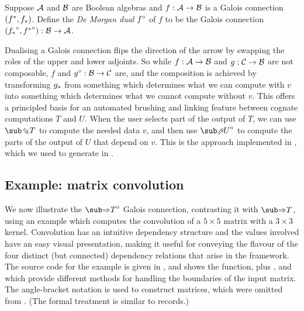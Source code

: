 \begin{definition}
   Suppose $\mathcal{A}$ and $\mathcal{B}$ are Boolean algebras and $f: \mathcal{A} \to \mathcal{B}$ is a Galois connection $({f}^*,{f}_*)$. Define the \emph{De Morgan dual} ${f}^{\circ}$ of $f$ to be the Galois connection $({{f}_*}^{\circ}, {{f}^*}^{\circ}): \mathcal{B} \to \mathcal{A}$.
\end{definition}

\noindent Dualising a Galois connection flips the direction of the arrow by swapping the roles of the upper and lower adjoints. So while $f: \mathcal{A} \to \mathcal{B}$ and $g: \mathcal{C} \to \mathcal{B}$ are not composable, $f$ and ${g}^{\circ}: \mathcal{B} \to \mathcal{C}$ are, and the composition is achieved by transforming ${g}_*$ from something which determines what we can compute with $v$ into something which determines what we cannot compute without $v$. This offers a principled basis for an automated brushing and linking feature between cognate computations $T$ and $U$. When the user selects part of the output of $T$, we can use $\evalBwdF{T}$ to compute the needed data $v$, and then use $\dual{\evalFwdF{U}}$ to compute the parts of the output of $U$ that depend on $v$. This is the approach implemented in \OurLanguage, which we used to generate  in .

\subsection{Example: matrix convolution}
\label{sec:de-morgan:example}

We now illustrate the $\dual{\evalGC{T}}$ Galois connection, contrasting it with $\evalGC{T}$, using an example which computes the convolution of a $5 \times 5$ matrix with a $3 \times 3$ kernel. Convolution has an intuitive dependency structure and the values involved have an easy visual presentation, making it useful for conveying the flavour of the four distinct (but connected) dependency relations that arise in the framework. The source code for the example is given in , and shows the  function, plus ,  and  which provide different methods for handling the boundaries of the input matrix. The angle-bracket notation is used to construct matrices, which were omitted from . (The formal treatment is similar to records.)



